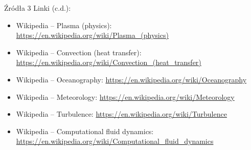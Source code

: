 \documentclass{beamer}
\begin{document}
\begin{frame}{Źródła 3}
	Linki (c.d.):
	\begin{itemize}
		\item Wikipedia -- Plasma (physics):
		\url{https://en.wikipedia.org/wiki/Plasma_(physics)}

		\item Wikipedia -- Convection (heat transfer):
		\url{https://en.wikipedia.org/wiki/Convection_(heat_transfer)}

		\item Wikipedia -- Oceanography:
		\url{https://en.wikipedia.org/wiki/Oceanography}

		\item Wikipedia -- Meteorology:
		\url{https://en.wikipedia.org/wiki/Meteorology}

		\item Wikipedia -- Turbulence:
		\url{https://en.wikipedia.org/wiki/Turbulence}

		\item Wikipedia -- Computational fluid dynamics:
		\url{https://en.wikipedia.org/wiki/Computational_fluid_dynamics}
	\end{itemize}
\end{frame}


\pglastframe


\end{document}
